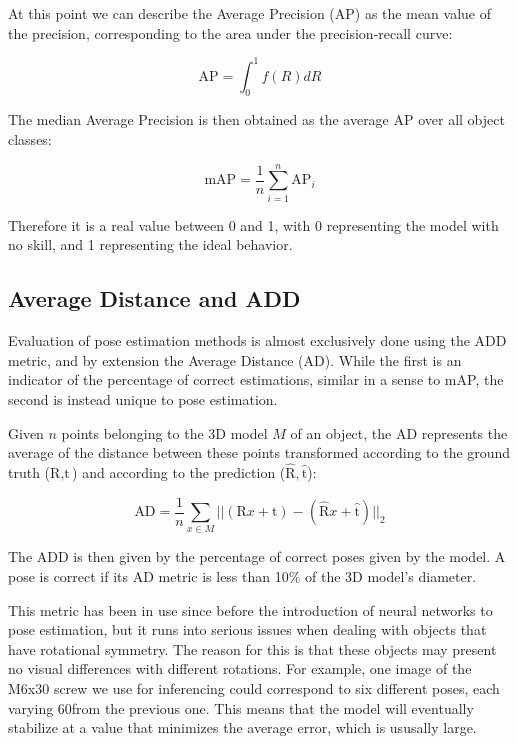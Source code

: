 At this point we can describe the Average Precision (AP) as the mean value of the precision, corresponding to the area under the precision-recall curve:

\begin{equation*}
    \text{AP} = \int_{0}^{1} f(R)dR
\end{equation*}

The median Average Precision is then obtained as the average AP over all object classes:

\begin{equation*}
    \text{mAP} = \frac{1}{n} \sum_{i=1}^{n} \text{AP}_{i}
\end{equation*}

Therefore it is a real value between 0 and 1, with 0 representing the model with no skill, and 1 representing the ideal behavior.

\subsection{Average Distance and ADD}

Evaluation of pose estimation methods is almost exclusively done using the ADD metric, and by extension the Average Distance (AD). While the first is an indicator of the percentage of correct estimations, similar in a sense to mAP, the second is instead unique to pose estimation.

Given $n$ points belonging to the 3D model $M$ of an object, the AD represents the average of the distance between these points transformed according to the ground truth ($\text{R}, \text{t}$) and according to the prediction ($\hat{\text{R}}, \hat{\text{t}}$):

\begin{equation*}
    \text{AD} = \frac{1}{n} \sum_{x \in M} ||(\text{R}x + \text{t}) - 
    (\hat{\text{R}}x + \hat{\text{t}})||_2
\end{equation*}

The ADD is then given by the percentage of correct poses given by the model. A pose is correct if its AD metric is less than 10\% of the 3D model's diameter.

This metric has been in use since before the introduction of neural networks to pose estimation, but it runs into serious issues when dealing with objects that have rotational symmetry. The reason for this is that these objects may present no visual differences with different rotations. For example, one image of the M6x30 screw we use for inferencing could correspond to six different poses, each varying 60\degree from the previous one. This means that the model will eventually stabilize at a value that minimizes the average error, which is ususally large.

